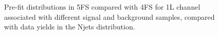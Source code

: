 \begin{figure}[htbp!]
\begin{center}
\begin{tabular}{cccc}
                                                                                                                                                                                      \end{tabular}                                                                                                                                                                  
\caption{\label{4FSvs5FS_dataMC_nJets}Pre-fit distributions in 5FS compared with 4FS for 1L channel associated with different signal and background samples, compared with data yields in the Njets distribution.}                                                                                                                                                                            
\end{center}                                                                                                                                                                       
\end{figure}                                                                                                                                                                                   

